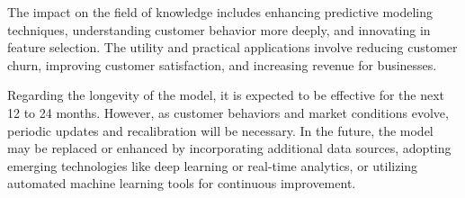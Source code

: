\documentclass[12pt]{article}
\begin{document}
The impact on the field of knowledge includes enhancing predictive modeling techniques, understanding customer behavior more deeply, and innovating in feature selection. The utility and practical applications involve reducing customer churn, improving customer satisfaction, and increasing revenue for businesses.

Regarding the longevity of the model, it is expected to be effective for the next 12 to 24 months. However, as customer behaviors and market conditions evolve, periodic updates and recalibration will be necessary. In the future, the model may be replaced or enhanced by incorporating additional data sources, adopting emerging technologies like deep learning or real-time analytics, or utilizing automated machine learning tools for continuous improvement.
\end{document}
